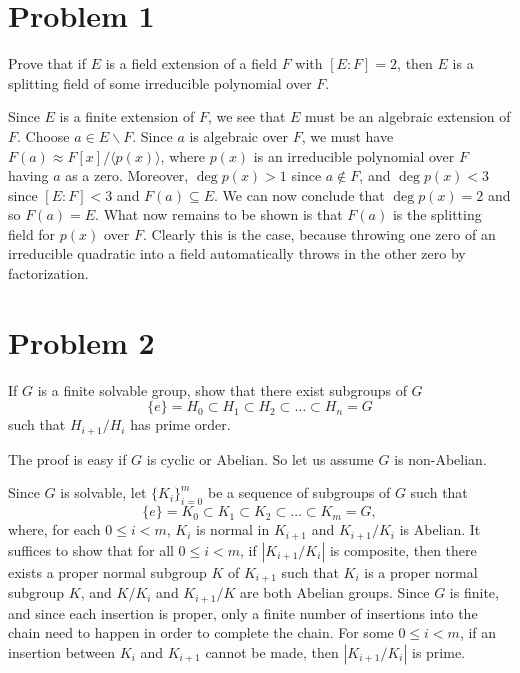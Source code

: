 \documentclass{article}
\begin{document}
\newcommand{\Z}{\mathbb{Z}}
\newcommand{\Q}{\mathbb{Q}}
\newcommand{\GF}{\mbox{GF}}
\newcommand{\al}{\alpha}

\section*{Problem 1}

Prove that if $E$ is a field extension of a field $F$ with $[E:F]=2$,
then $E$ is a splitting field of some irreducible polynomial over $F$.

Since $E$ is a finite extension of $F$, we see that $E$ must be an algebraic
extension of $F$.  Choose $a\in E\backslash F$.  Since $a$ is algebraic
over $F$, we must have $F(a)\approx F[x]/\langle p(x)\rangle$, where
$p(x)$ is an irreducible polynomial over $F$ having $a$ as a zero.
Moreover, $\deg p(x)>1$ since $a\not\in F$, and $\deg p(x)<3$ since
$[E:F]<3$ and $F(a)\subseteq E$.
We can now conclude that $\deg p(x)=2$ and so $F(a)=E$.
What now remains to be shown is that $F(a)$ is the splitting
field for $p(x)$ over $F$.  Clearly this is the case, because
throwing one zero of an irreducible quadratic into a field
automatically throws in the other zero by factorization.

\section*{Problem 2}

If $G$ is a finite solvable group, show that there exist subgroups of
$G$
\begin{equation*}
\{e\}=H_0\subset H_1\subset H_2\subset\dots\subset H_n=G
\end{equation*}
such that $H_{i+1}/H_i$ has prime order.

The proof is easy if $G$ is cyclic or Abelian.  So let us
assume $G$ is non-Abelian.

Since $G$ is solvable, let $\{K_i\}_{i=0}^m$ be a sequence
of subgroups of $G$ such that
\begin{equation*}
\{e\}=K_0\subset K_1\subset K_2\subset\dots\subset K_m=G,
\end{equation*}
where, for each $0\leq i<m$, $K_i$ is normal in $K_{i+1}$ and $K_{i+1}/K_i$
is Abelian.  It suffices to show that for all $0\leq i<m$, if
$|K_{i+1}/K_i|$ is composite, then there exists a proper normal subgroup $K$
of $K_{i+1}$ such that $K_i$ is a proper normal subgroup $K$, and $K/K_i$ and
$K_{i+1}/K$ are both Abelian groups.  Since $G$ is finite, and
since each insertion is proper, only a finite
number of insertions into the chain need to happen in order to complete the chain.
For some $0\leq i<m$, if an insertion between $K_i$ and $K_{i+1}$ cannot be made,
then $|K_{i+1}/K_i|$ is prime.
\end{document}
